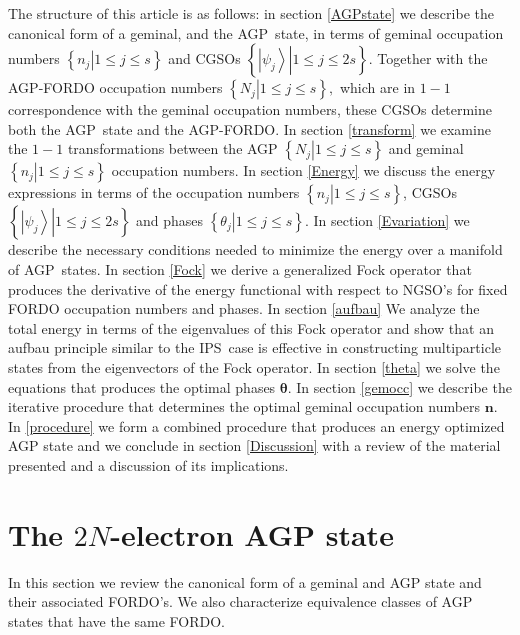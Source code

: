 \documentclass[aps,preprint]{revtex4}%
\begin{document}
The structure of this article is as follows: in section \ref{AGPstate} we
describe the canonical form of a geminal, and the AGP\ state, in terms of
geminal occupation numbers $\left\{  \left.  n_{j}\right\vert 1\leq j\leq
s\right\}  $ and CGSOs $\left\{  \left.  \left\vert \psi_{j}\right\rangle
\right\vert 1\leq j\leq2s\right\}  .$ Together with the AGP-FORDO occupation
numbers $\left\{  \left.  N_{j}\right\vert 1\leq j\leq s\right\}  ,$ which are
in $1-1$ correspondence with the geminal occupation numbers, these CGSOs
determine both the AGP\ state and the AGP-FORDO. In section \ref{transform} we
examine the $1-1$ transformations between the AGP $\left\{  \left.
N_{j}\right\vert 1\leq j\leq s\right\}  $ and geminal $\left\{  \left.
n_{j}\right\vert 1\leq j\leq s\right\}  $ occupation numbers. In section
\ref{Energy} we discuss the energy expressions in terms of the occupation
numbers $\left\{  \left.  n_{j}\right\vert 1\leq j\leq s\right\}  $, CGSOs
$\left\{  \left.  \left\vert \psi_{j}\right\rangle \right\vert 1\leq
j\leq2s\right\}  $ and phases $\left\{  \left.  \theta_{j}\right\vert 1\leq
j\leq s\right\}  .$ In section \ref{Evariation} we describe the necessary
conditions needed to minimize the energy over a manifold of AGP\ states. In
section \ref{Fock} we derive a generalized Fock operator that produces the
derivative of the energy functional with respect to NGSO's for fixed FORDO
occupation numbers and phases. In section \ref{aufbau} We analyze the total
energy in terms of the eigenvalues of this Fock operator and show that an
aufbau principle similar to the IPS\ case is effective in constructing
multiparticle states from the eigenvectors of the Fock operator. In section
\ref{theta} we solve the equations that produces the optimal phases
$\mathbf{\theta.}$ In section \ref{gemocc} we describe the iterative procedure
that determines the optimal geminal occupation numbers $\mathbf{n}$. In
\ref{procedure} we form a combined procedure that produces an energy optimized
AGP state and we conclude in section \ref{Discussion} with a review of the
material presented and a discussion of its implications.

\section{The $2N$-electron AGP state\label{AGPstate}}

In this section we review the canonical form of a geminal and AGP state and
their associated FORDO's. We also characterize equivalence classes of AGP
states that have the same FORDO.
\end{document}
